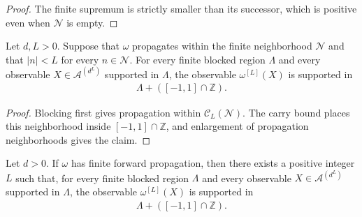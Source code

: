 \begin{proof}\leanok
    The finite supremum is strictly smaller than its successor, which is
    positive even when $\mathcal N$ is empty.
\end{proof}

\begin{lemma}
    \label{lem:qca_propagates_within_blocked_nearest_neighbor}
    \leanok
    Let $d,L>0$.  Suppose that $\omega$ propagates within the finite
    neighborhood $\mathcal N$ and that $|n|<L$ for every $n\in\mathcal N$.
    For every finite blocked region $\Lambda$ and every observable
    $X\in\mathcal A^{(d^L)}$ supported in $\Lambda$, the observable
    $\omega^{[L]}(X)$ is supported in
    \begin{align}
        \Lambda+([-1,1]\cap\mathbb Z).
    \end{align}
\end{lemma}

\begin{proof}\leanok
    Blocking first gives propagation within $\mathcal C_L(\mathcal N)$.
    The carry bound places this neighborhood inside
    $[-1,1]\cap\mathbb Z$, and enlargement of propagation neighborhoods gives
    the claim.
\end{proof}

\begin{lemma}
    \label{thm:qca_finite_propagation_exists_blocked_nearest_neighbor}
    \leanok
    Let $d>0$.  If $\omega$ has finite forward propagation, then there exists
    a positive integer $L$ such that, for every finite blocked region
    $\Lambda$ and every observable $X\in\mathcal A^{(d^L)}$ supported in
    $\Lambda$, the observable $\omega^{[L]}(X)$ is supported in
    \begin{align}
        \Lambda+([-1,1]\cap\mathbb Z).
    \end{align}
\end{lemma}

